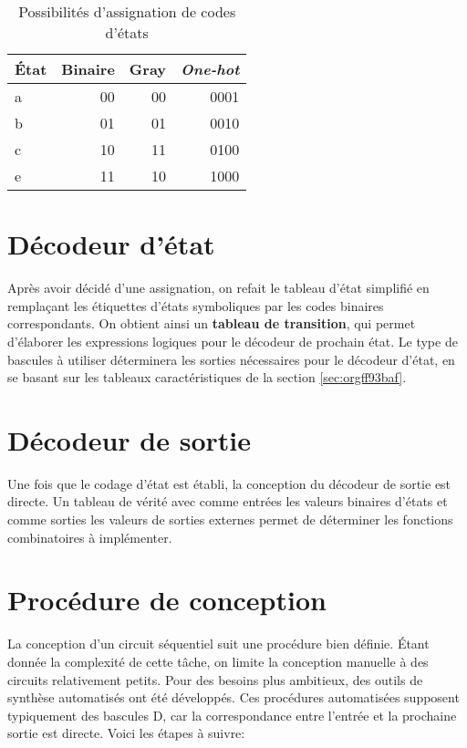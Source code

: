\documentclass[letter, oneside]{book}
\begin{document}
\begin{table}[htbp]
\caption{\label{tab:orgbdbf0d9}Possibilités d'assignation de codes d'états}
\centering
\begin{tabular}{lrrr}
État & Binaire & Gray & \emph{One-hot}\\[0pt]
\hline
a & 00 & 00 & 0001\\[0pt]
b & 01 & 01 & 0010\\[0pt]
c & 10 & 11 & 0100\\[0pt]
e & 11 & 10 & 1000\\[0pt]
\end{tabular}
\end{table}

\section{Décodeur d'état}
\label{sec:org1c3fab9}

Après avoir décidé d'une assignation, on refait le tableau d'état
simplifié en remplaçant les étiquettes d'états symboliques par les
codes binaires correspondants. On obtient ainsi un \textbf{tableau de
transition}, qui permet d'élaborer les expressions logiques pour le
décodeur de prochain état. Le type de bascules à utiliser déterminera
les sorties nécessaires pour le décodeur d'état, en se basant sur les
tableaux caractéristiques de la section \ref{sec:orgff93baf}.

\section{Décodeur de sortie}
\label{sec:org20e30c6}

Une fois que le codage d'état est établi, la conception du décodeur de
sortie est directe. Un tableau de vérité avec comme entrées les
valeurs binaires d'états et comme sorties les valeurs de sorties
externes permet de déterminer les fonctions combinatoires à
implémenter.

\section{Procédure de conception}
\label{sec:orge0815ee}

La conception d'un circuit séquentiel suit une procédure bien
définie. Étant donnée la complexité de cette tâche, on limite la
conception manuelle à des circuits relativement petits. Pour des
besoins plus ambitieux, des outils de synthèse automatisés ont été
développés. Ces procédures automatisées supposent typiquement des
bascules D, car la correspondance entre l'entrée et la prochaine
sortie est directe. Voici les étapes à suivre:
\end{document}
